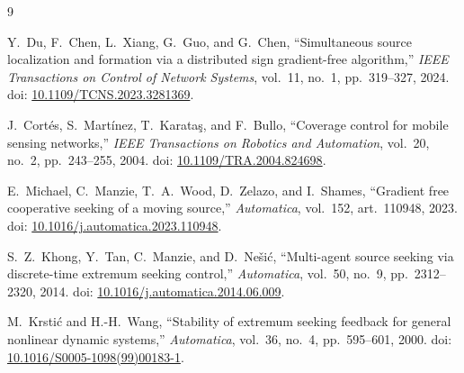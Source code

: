 \documentclass[11pt,a4paper]{article}
\theoremstyle{plain}
\theoremstyle{definition}
\begin{document}
\begin{thebibliography}{9}

Y.~Du, F.~Chen, L.~Xiang, G.~Guo, and G.~Chen,
``Simultaneous source localization and formation via a distributed sign gradient-free algorithm,''
\emph{IEEE Transactions on Control of Network Systems}, vol.~11, no.~1, pp.~319--327, 2024.
doi: \href{https://doi.org/10.1109/TCNS.2023.3281369}{10.1109/TCNS.2023.3281369}.

J.~Cort\'es, S.~Mart\'inez, T.~Karata\c{s}, and F.~Bullo,
``Coverage control for mobile sensing networks,''
\emph{IEEE Transactions on Robotics and Automation}, vol.~20, no.~2, pp.~243--255, 2004.
doi: \href{https://doi.org/10.1109/TRA.2004.824698}{10.1109/TRA.2004.824698}.

E.~Michael, C.~Manzie, T.~A.~Wood, D.~Zelazo, and I.~Shames,
``Gradient free cooperative seeking of a moving source,''
\emph{Automatica}, vol.~152, art.~110948, 2023.
doi: \href{https://doi.org/10.1016/j.automatica.2023.110948}{10.1016/j.automatica.2023.110948}.

S.~Z.~Khong, Y.~Tan, C.~Manzie, and D.~Ne\v{s}i{\'c},
``Multi-agent source seeking via discrete-time extremum seeking control,''
\emph{Automatica}, vol.~50, no.~9, pp.~2312--2320, 2014.
doi: \href{https://doi.org/10.1016/j.automatica.2014.06.009}{10.1016/j.automatica.2014.06.009}.

M.~Krsti{\'c} and H.-H.~Wang,
``Stability of extremum seeking feedback for general nonlinear dynamic systems,''
\emph{Automatica}, vol.~36, no.~4, pp.~595--601, 2000.
doi: \href{https://doi.org/10.1016/S0005-1098(99)00183-1}{10.1016/S0005-1098(99)00183-1}.

\end{thebibliography}
\end{document}
